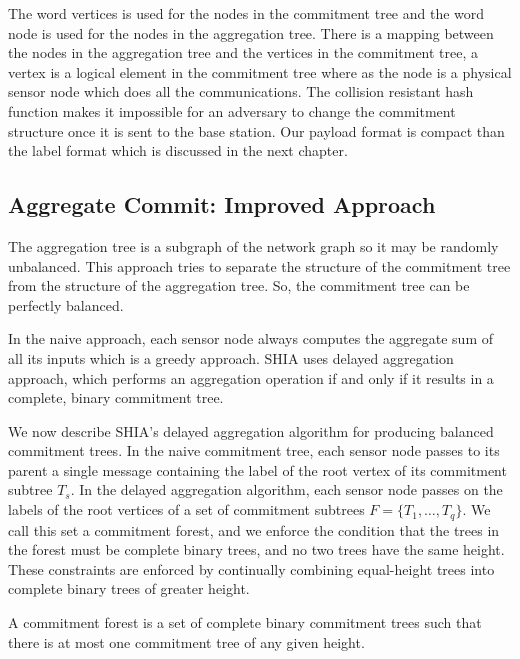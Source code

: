 		The word vertices is used for the nodes in the commitment tree and the word node is used for the nodes in the aggregation tree.
		There is a mapping between the nodes in the aggregation tree and the vertices in the commitment tree, a vertex is a logical element in the commitment tree where as the node is a physical sensor node which does all the communications.		
		The collision resistant hash function makes it impossible for an adversary to change the commitment structure once it is sent to the base station.
		Our payload format is compact than the label format which is discussed in the next chapter.
		
		\subsection{Aggregate Commit: Improved Approach} 
			\label{sub:aggregate_commit_improved_approach}
			The aggregation tree is a subgraph of the network graph so it may be randomly unbalanced.
			This approach tries to separate the structure of the commitment tree from the structure of the aggregation tree.
			So, the commitment tree can be perfectly balanced.

			In the naive approach, each sensor node always computes the aggregate sum of all its inputs which is a greedy approach.
			SHIA uses delayed aggregation approach, which performs an aggregation operation if and only if it results in a complete, binary commitment tree.

			We now describe SHIA's delayed aggregation algorithm for producing balanced commitment trees.
			In the naive commitment tree, each sensor node passes to its parent a single message containing the label of the root vertex of its commitment subtree $T_{s}$.
			In the delayed aggregation algorithm, each sensor node passes on the labels of the root vertices of a set of commitment subtrees $F = \{ T_{1}, \dotsc, T_{q} \}$.
			We call this set a commitment forest, and we enforce the condition that the trees in the forest must be complete binary trees, and no two trees have the same height. 
			These constraints are enforced by continually combining equal-height trees into complete binary trees of greater height.
			\begin{definition}
				\cite{chan2006secure}
				\label{def:commitment-forest}
				A commitment forest is a set of complete binary commitment trees such that there is at most one commitment tree of any given height.
			\end{definition}

